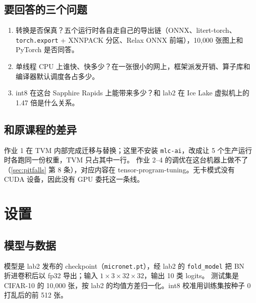 \documentclass[11pt,a4paper]{ctexart}
\begin{document}
\subsection{要回答的三个问题}
\begin{enumerate}
  \item 转换是否保真？五个运行时各自走自己的导出链（ONNX、litert-torch、\texttt{torch.export} + XNNPACK 分区、Relax ONNX 前端），10,000 张图上和 PyTorch 是否同答。
  \item 单线程 CPU 上谁快、快多少？在一张很小的网上，框架派发开销、算子库和编译器默认调度各占多少。
  \item int8 在这台 Sapphire Rapids 上能带来多少？和 lab2 在 Ice Lake 虚拟机上的 1.47 倍是什么关系。
\end{enumerate}

\subsection{和原课程的差异}
作业 1 在 TVM 内部完成迁移与替换；这里不安装 \texttt{mlc-ai}，改成让 5 个生产运行时各跑同一份权重，TVM 只占其中一行。
作业 2--4 的调优在这台机器上做不了（\cref{sec:pitfalls} 第 8 条），对应内容在 tensor-program-tuning。无卡模式没有 CUDA 设备，因此没有 GPU 委托这一条线。

\section{设置}\label{sec:method}

\subsection{模型与数据}
模型是 lab2 发布的 checkpoint（\texttt{micronet.pt}），经 lab2 的 \texttt{fold\_model} 把 BN 折进卷积后以 fp32 导出；输入 $1\times3\times32\times32$，输出 10 类 logits。
测试集是 CIFAR-10 的 10,000 张，按 lab2 的均值方差归一化。int8 校准用训练集按种子 0 打乱后的前 512 张。
\end{document}
